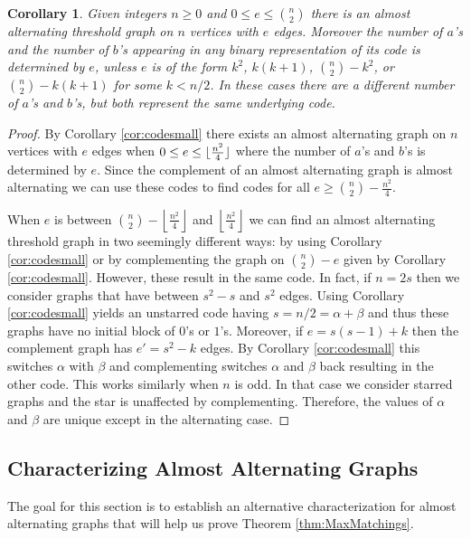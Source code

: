 \documentclass[12pt]{amsart}
\theoremstyle{plain}
\newtheorem{cor}[thm]{Corollary}
\theoremstyle{definition}
\DeclarePairedDelimiter{\floor}{\lfloor}{\rfloor}
\begin{document}
\begin{cor}\label{cor:findingcode}
Given integers $n\ge 0$ and $0\le e \le \binom{n}{2}$ there is an almost alternating threshold graph on $n$ vertices with $e$ edges.
 Moreover the number of $a$'s and the number of $b$'s appearing in any binary representation of its code is determined by $e$, unless $e$ is of the form $k^2$, $k(k+1)$, $\binom{n}{2} - k^2$, or $\binom{n}{2} - k(k+1)$ for some $k<n/2$.  In these cases there are a different number of $a$'s and $b$'s, but both represent the same underlying code.
\end{cor}
\begin{proof}
By Corollary \ref{cor:codesmall} there exists an almost alternating graph on $n$ vertices with $e$ edges when $0\le e \le \floor[big]{\frac{n^2}{4}}$ where the number of $a$'s and $b$'s is determined by $e$.  Since the complement of an almost alternating graph is almost alternating we can use these codes to find codes for all $e\ge \binom{n}{2} - \frac{n^2}{4}$.  

When $e$ is between $\binom{n}{2} - \left\lfloor\frac{n^2}{4}\right\rfloor$ and  $\left\lfloor\frac{n^2}{4}\right\rfloor$ we can find an almost alternating threshold graph in two seemingly different ways: by using Corollary \ref{cor:codesmall} or by complementing the graph on $\binom{n}{2}-e$ given by Corollary \ref{cor:codesmall}.  However, these result in the same code.  In fact, if $n=2s$ then we consider graphs that have between $s^2-s$ and $s^2$ edges. Using Corollary \ref{cor:codesmall} yields an unstarred code having $s = n/2 = \alpha + \beta$ and thus these graphs have no initial block of $0$'s or $1$'s.  Moreover, if $e=s(s-1)+k$ then the complement graph has $e'=s^2-k$ edges.  By Corollary \ref{cor:codesmall} this switches $\alpha$ with $\beta$ and complementing switches  $\alpha$ and $\beta$ back resulting in the other code.  This works similarly when $n$ is odd.  In that case we consider starred graphs and the star is unaffected by complementing.  Therefore, the values of $\alpha$ and $\beta$ are unique except in the alternating case.
\end{proof}

\subsection{Characterizing Almost Alternating Graphs}
The goal for this section is to establish an alternative characterization for almost alternating graphs that will help us prove Theorem \ref{thm:MaxMatchings}.
\end{document}
